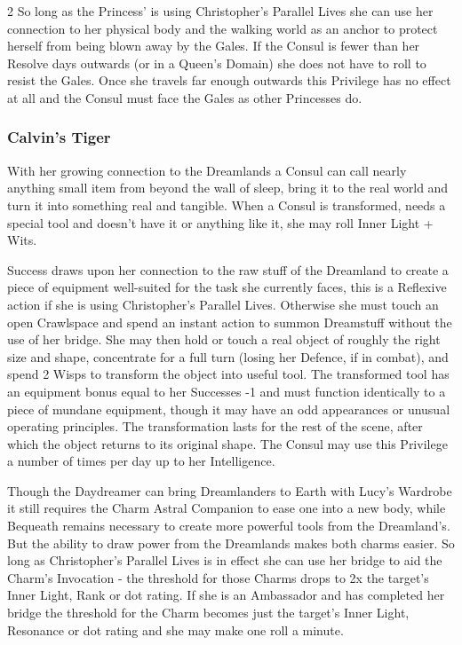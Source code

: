 \begin{multicols}{2}
So long as the Princess' is using Christopher's Parallel Lives she can use her connection to her physical body and the walking world as an anchor to protect herself from being blown away by the Gales. If the Consul is fewer than her Resolve days outwards (or in a Queen's Domain) she does not have to roll to resist the Gales. Once she travels far enough outwards this Privilege has no effect at all and the Consul must face the Gales as other Princesses do.

\subsubsection*{Calvin's Tiger}

With her growing connection to the Dreamlands a Consul can call nearly anything small item from beyond the wall of sleep, bring it to the real world and turn it into something real and tangible. When a Consul is transformed, needs a special tool and doesn't have it or anything like it, she may roll Inner Light + Wits. 

Success draws upon her connection to the raw stuff of the Dreamland to create a piece of equipment well-suited for the task she currently faces, this is a Reflexive action if she is using Christopher's Parallel Lives. Otherwise she must touch an open Crawlspace and spend an instant action to summon Dreamstuff without the use of her bridge. She may then hold or touch a real object of roughly the right size and shape, concentrate for a full turn (losing her Defence, if in combat), and spend 2 Wisps to transform the object into useful tool. The transformed tool has an equipment bonus equal to her Successes -1 and must function identically to a piece of mundane equipment, though it may have an odd appearances or unusual operating 
principles. The transformation lasts for the rest of the scene, after which the object returns to its original shape. The Consul may use this Privilege a number of times per day up to her Intelligence.

Though the Daydreamer can bring Dreamlanders to Earth with Lucy's Wardrobe it still requires the Charm Astral Companion to ease one into a new body, while Bequeath remains necessary to create more powerful tools from the Dreamland's. But the ability to draw power from the Dreamlands makes both charms easier. So long as Christopher’s Parallel Lives is in effect she can use her bridge to aid the Charm's Invocation - the threshold for those Charms drops to 2x the target's Inner Light, Rank or dot rating. If she is an Ambassador and has completed her bridge the threshold for the Charm becomes just the target's Inner Light, Resonance or dot rating and she may make one roll a minute. 


\end{multicols}
